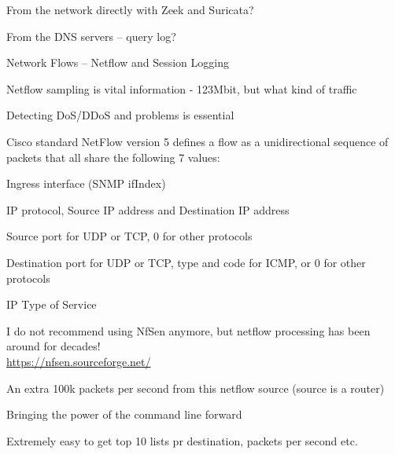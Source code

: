 \documentclass[Screen16to9,17pt]{foils}
\begin{document}
From the network directly with Zeek and Suricata?


From the DNS servers -- query log?





\begin{list1}
\item Network Flows -- Netflow and Session Logging
\item Netflow sampling is vital information - 123Mbit, but what kind of traffic
\item Detecting DoS/DDoS and problems is essential
\item Cisco standard NetFlow version 5 defines a flow as a unidirectional sequence of packets that all share the following 7 values:
\begin{list2}
\item Ingress interface (SNMP ifIndex)
\item IP protocol, Source IP address and Destination IP address
\item Source port for UDP or TCP, 0 for other protocols
\item Destination port for UDP or TCP, type and code for ICMP, or 0 for other protocols
\item IP Type of Service
\end{list2}
\end{list1}




I do not recommend using NfSen anymore, but netflow processing has been around for decades!\\
\url{https://nfsen.sourceforge.net/}



\centerline{An extra 100k packets per second from this netflow source (source is a router)}




\begin{list2}
\item Bringing the power of the command line forward
\item Extremely easy to get top 10 lists pr destination, packets per second etc.
\end{list2}
\end{document}
